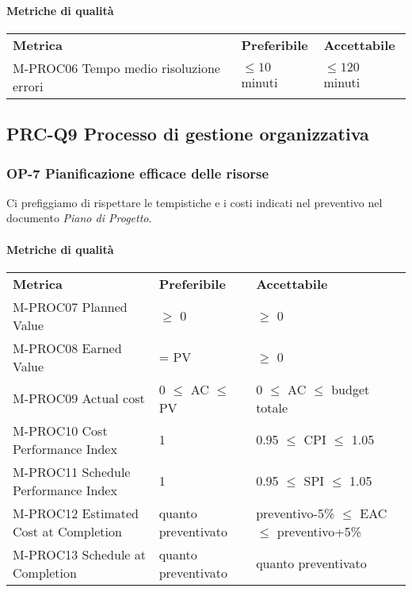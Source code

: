 			\paragraph{Metriche di qualità} \mbox{}			
			\begin{longtable} {
					>{}p{80mm} 
					>{}p{25mm}
					>{}p{25mm}
				}
				\rowcolor{gray!50}
				\textbf{Metrica} & \textbf{Preferibile} & \textbf{Accettabile} \TBstrut \TBstrut \\
				M-PROC06 Tempo medio risoluzione errori & $\le 10$ minuti & $\le 120$ minuti \TBstrut \\ [2mm]
			\end{longtable}					

	\subsection{PRC-Q9 Processo di gestione organizzativa}
		\subsubsection{OP-7 Pianificazione efficace delle risorse}
			Ci prefiggiamo di rispettare le tempistiche e i costi indicati nel preventivo nel documento \textit{Piano di Progetto}.
			\paragraph{Metriche di qualità} \mbox{} 
			\begin{longtable} {
					>{}p{60mm} 
					>{}p{35mm}
					>{}p{50mm}
				}
				\rowcolor{gray!50}
				\textbf{Metrica} & \textbf{Preferibile} & \textbf{Accettabile} \TBstrut \TBstrut \\
				M-PROC07 Planned Value & $\ge$ 0 & $\ge$ 0 \TBstrut \\ [2mm]
				M-PROC08 Earned Value & = PV & $\ge$ 0 \TBstrut \\ [2mm]
				M-PROC09 Actual cost & 0 $\le$ AC $\le$ PV &0 $\le$ AC $\le$ budget totale \TBstrut \\ [2mm]				
				M-PROC10 Cost Performance Index & 1 & 0.95 $\le$ CPI $\le$ 1.05 \TBstrut \\ [2mm]				
				M-PROC11 Schedule Performance Index & 1 & 0.95 $\le$ SPI $\le$ 1.05 \TBstrut \\ [2mm]				
				M-PROC12 Estimated Cost at Completion & quanto preventivato & preventivo-5\% $\le$ EAC $\le$ preventivo+5\% \TBstrut \\ [2mm]
				M-PROC13 Schedule at Completion & quanto preventivato & quanto preventivato \TBstrut \\ [2mm]				
			\end{longtable}

